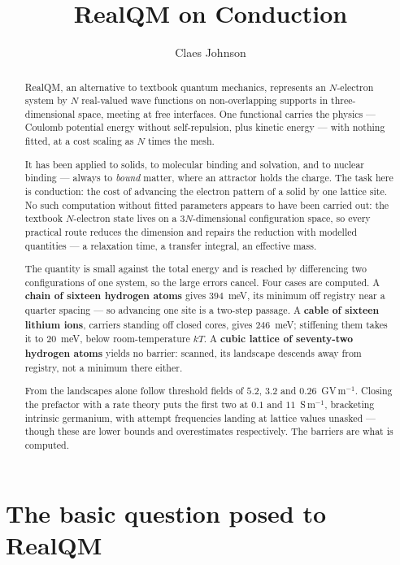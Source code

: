 \documentclass[11pt]{article}
\title{RealQM on Conduction}
\author[1]{Claes Johnson}
\affil[1]{KTH Royal Institute of Technology, SE-100 44 Stockholm, Sweden \\
\texttt{claesjohnson@gmail.com}}
\date{}
\begin{document}
\maketitle

\begin{abstract}
\noindent RealQM, an alternative to textbook quantum mechanics, represents an $N$-electron system by $N$
real-valued wave functions on non-overlapping supports in three-dimensional space, meeting at free
interfaces. One functional carries the physics --- Coulomb potential energy without self-repulsion,
plus kinetic energy --- with nothing fitted, at a cost scaling as $N$ times the mesh.

It has been applied to solids, to molecular binding and solvation, and to nuclear binding --- always
to \emph{bound} matter, where an attractor holds the charge. The task here is conduction: the cost
of advancing the electron pattern of a solid by one lattice site. No such computation without fitted
parameters appears to have been carried out: the textbook $N$-electron state lives on a
$3N$-dimensional configuration space, so every practical route reduces the dimension and repairs the
reduction with modelled quantities --- a relaxation time, a transfer integral, an effective mass.

The quantity is small against the total energy and is reached by differencing two configurations of
one system, so the large errors cancel. Four cases are computed. A \textbf{chain of sixteen hydrogen
atoms} gives $394$~meV, its minimum off registry near a quarter spacing --- so
advancing one site is a two-step passage. A \textbf{cable of sixteen lithium ions}, carriers
standing off closed cores, gives $246$~meV; stiffening them takes it to $20$~meV, below
room-temperature $kT$. A \textbf{cubic lattice of seventy-two hydrogen atoms} yields no
barrier: scanned, its landscape descends away from registry, not a minimum there either.

From the landscapes alone follow threshold fields of $5.2$, $3.2$ and $0.26$~GV\,m$^{-1}$. Closing
the prefactor with a rate theory puts the first two at $0.1$ and $11$~S\,m$^{-1}$, bracketing
intrinsic germanium, with attempt frequencies landing at lattice values unasked --- though these are
lower bounds and overestimates respectively. The barriers are what is computed.
\end{abstract}

\section{The basic question posed to RealQM}
\end{document}
